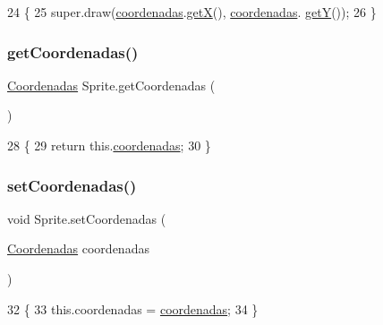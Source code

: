 \begin{DoxyCode}
24                       \{
25         super.draw(\mbox{\hyperlink{class_sprite_ada651b6921cee54a619e11c4eb01526d}{coordenadas}}.\mbox{\hyperlink{class_coordenadas_a7b3fc725f9146220813dc0084fecc3ca}{getX}}(), \mbox{\hyperlink{class_sprite_ada651b6921cee54a619e11c4eb01526d}{coordenadas}}.
      \mbox{\hyperlink{class_coordenadas_aa10f46c8c62df3db3a05d4550f20b197}{getY}}());
26     \}
\end{DoxyCode}
\mbox{\label{class_sprite_a1ea85b8bbd32ba06d279b76b3ffad9e0}} 
\subsubsection{\texorpdfstring{get\+Coordenadas()}{getCoordenadas()}}
{\footnotesize\ttfamily \mbox{\hyperlink{class_coordenadas}{Coordenadas}} Sprite.\+get\+Coordenadas (\begin{DoxyParamCaption}{ }\end{DoxyParamCaption})\hspace{0.3cm}{\ttfamily [inline]}}


\begin{DoxyCode}
28                                        \{
29         \textcolor{keywordflow}{return} this.\mbox{\hyperlink{class_sprite_ada651b6921cee54a619e11c4eb01526d}{coordenadas}};
30     \}
\end{DoxyCode}
\mbox{\label{class_sprite_ab6507a100fad450d688f71d08cc91715}} 
\subsubsection{\texorpdfstring{set\+Coordenadas()}{setCoordenadas()}\hspace{0.1cm}{\footnotesize\ttfamily [1/2]}}
{\footnotesize\ttfamily void Sprite.\+set\+Coordenadas (\begin{DoxyParamCaption}\item[{\mbox{\hyperlink{class_coordenadas}{Coordenadas}}}]{coordenadas }\end{DoxyParamCaption})\hspace{0.3cm}{\ttfamily [inline]}}


\begin{DoxyCode}
32                                                        \{
33         this.coordenadas = \mbox{\hyperlink{class_sprite_ada651b6921cee54a619e11c4eb01526d}{coordenadas}};
34     \}
\end{DoxyCode}
\mbox{\label{class_sprite_abc4cf5a191273ec5ae4943b95d3198cb}} 
